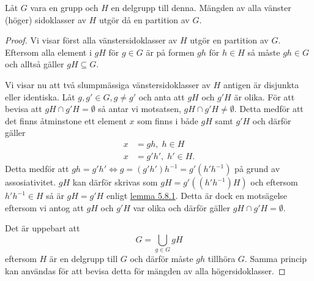 \documentclass{article}
\theoremstyle{definition}
\begin{document}
\hypertarget{lemma4.2}{}
\begin{mylemma}{}{}
  Låt $G$ vara en grupp och $H$ en delgrupp till denna. 
  Mängden av alla vänster (höger) sidoklasser av $H$ utgör då en partition av $G$.
\end{mylemma}
\begin{proof}
  Vi visar först alla vänstersidoklasser av $H$ utgör en partition av $G$. 
  Eftersom alla element i $gH$ för $g \in G$ är på formen $gh$ för $h \in H$ så måste $gh \in G$
  och alltså gäller $gH \subseteq G$.

  Vi visar nu att två slumpmässiga vänstersidoklasser av $H$ antigen är disjunkta eller identiska.
  Låt
  $g, g' \in G, g \neq g'$ och anta att $gH$ och $g'H$ är olika. För att bevisa att 
  $gH \cap g'H = \emptyset$ så antar vi motsatsen, $gH \cap g'H \neq \emptyset$.
  Detta medför att det finns åtminstone ett element $x$ som finns i både $gH$ samt $g'H$ 
  och därför gäller
  \begin{align*}
    x &= gh, \; h \in H \\
    x &= g'h', \; h' \in H.
  \end{align*}
  Detta medför att $gh = g'h' \iff g = (g'h')h^{-1} = g'(h'h^{-1})$ på grund av assosiativitet.
  $gH$ kan därför skrivas som $gH = g'((h'h^{-1})H)$ och eftersom $h'h^{-1} \in H$ så är 
  $gH = g'H$ enligt \hyperlink{lemma4.1}{lemma 5.8.1}. Detta är dock en motsägelse eftersom vi antog att $gH$ och $g'H$ var 
  olika och därför gäller $gH \cap g'H = \emptyset$.

  Det är uppebart att
  \[G = \bigcup_{g \in G} gH\]
  eftersom $H$ är en delgrupp till $G$ och därför måste $gh$ tillhöra $G$.
  Samma princip kan användas för att bevisa detta för mängden av alla
  högersidoklasser.
\end{proof}
\end{document}
